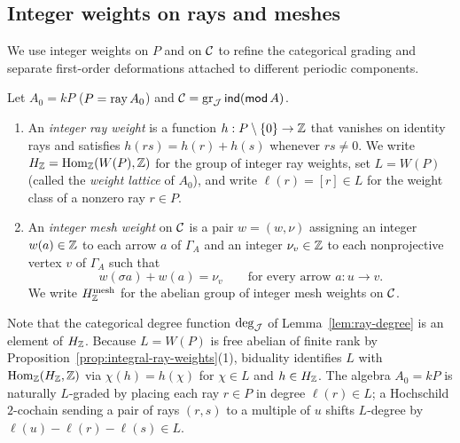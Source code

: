 \subsection{Integer weights on rays and meshes}

We use integer weights on $P$ and on $\mathcal C$ to refine the categorical grading
and separate first-order deformations attached to different periodic
components.

\begin{definition}
\label{def:integer-weights}
Let $A_0=kP$ ($P=\operatorname{ray} A_0$) and $\mathcal C=\operatorname{gr}_\mathcal J\operatorname{\mathsf{ind}}(\operatorname{\mathsf{mod}} A)$.
\begin{enumerate}[label={\upshape(\arabic*)}]
\item An \emph{integer ray weight} is a function $h:P\setminus\{0\}\to\mathbb Z$
that vanishes on identity rays and satisfies $h(rs)=h(r)+h(s)$ whenever
$rs\ne0$. We write $H_{\mathbb Z}=\operatorname{Hom}_{\mathbb Z}(W(P),\mathbb Z)$ for the group of integer ray
weights, set $L=W(P)$ (called the \emph{weight lattice} of $A_0$), and write
$\ell(r)=[r]\in L$ for the weight class of a nonzero ray $r\in P$.
\item An \emph{integer mesh weight} on $\mathcal C$ is a pair $w=(w,\nu)$ assigning an
integer $w(a)\in\mathbb Z$ to each arrow $a$ of $\Gamma_A$ and an integer
$\nu_v\in\mathbb Z$ to each nonprojective vertex $v$ of $\Gamma_A$ such that
\[
                   w(\sigma a)+w(a)=\nu_v\qquad\text{for every arrow }a:u\to v.
\]
We write $H^{\mathrm{mesh}}_{\mathbb Z}$ for the abelian group of integer mesh
weights on $\mathcal C$.
\end{enumerate}
\end{definition}

Note that the categorical degree function $\deg_\mathcal J$ of Lemma~\ref{lem:ray-degree}
is an element of $H_{\mathbb Z}$. Because $L=W(P)$ is free abelian of finite rank by
Proposition~\ref{prop:integral-ray-weights}(1), biduality identifies $L$
with $\operatorname{Hom}_{\mathbb Z}(H_{\mathbb Z},\mathbb Z)$ via $\chi(h)=h(\chi)$ for $\chi\in L$ and
$h\in H_{\mathbb Z}$. The algebra $A_0=kP$ is naturally $L$-graded by placing each
ray $r\in P$ in degree $\ell(r)\in L$; a Hochschild $2$-cochain sending a
pair of rays $(r,s)$ to a multiple of $u$ shifts $L$-degree by
$\ell(u)-\ell(r)-\ell(s)\in L$.

